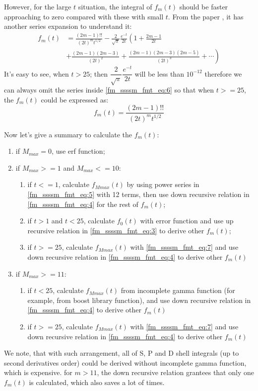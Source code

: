 However, for the large $t$ situation, the integral of $f_{m}(t)$ should be faster
approaching to zero compared with these with small $t$. From the paper 
\cite{harris1983sssm}, it has another series expansion to understand it:
\begin{equation}
\begin{split}
 f_{m}(t) &= \frac{(2m-1)!!}{(2t)^{m}t^{1/2}}-\frac{2}{\sqrt{\pi}}\frac{e^{-t}}{2t} 
 \left( 1+\frac{2m-1}{2t} \right. \\
 &+ \left. \frac{(2m-1)(2m-3)}{(2t)^{2}} + \frac{(2m-1)(2m-3)(2m-5)}{(2t)^{3}}+ \cdots 
 \right) 
\end{split}
 \label{fm_ssssm_fmt_eq:6}
\end{equation}
It's easy to see, when $t>25$; then $\dfrac{2}{\sqrt{\pi}}\dfrac{e^{-t}}{2t}$
will be less than $10^{-12}$ therefore we can always omit the series inside 
\ref{fm_ssssm_fmt_eq:6} so that when $t>=25$, the $f_{m}(t)$ could be expressed 
as:
\begin{equation}
 \label{fm_ssssm_fmt_eq:7}
 f_{m}(t) = \frac{(2m-1)!!}{(2t)^{m}t^{1/2}}
\end{equation}

Now let's give a summary to calculate the $f_{m}(t)$:
\begin{enumerate}
 \item if $M_{max} = 0$, use erf function;
 \item if $M_{max} >= 1$ and $M_{max} <= 10$:
 \begin{enumerate}
  \item if $t<=1$, calculate $f_{Mmax}(t)$ by using power series in 
  \ref{fm_ssssm_fmt_eq:5} with 12 terms, then use down recursive relation
  in \ref{fm_ssssm_fmt_eq:4} for the rest of $f_{m}(t)$;
  \item if $t>1$ and $t<25$, calculate $f_{0}(t)$ with error function and 
  use up recursive relation in \ref{fm_ssssm_fmt_eq:3} to derive other $f_{m}(t)$;
  \item if $t>=25$, calculate $f_{Mmax}(t)$ with \ref{fm_ssssm_fmt_eq:7} and use down 
  recursive relation in \ref{fm_ssssm_fmt_eq:4} to derive other $f_{m}(t)$
 \end{enumerate}
 \item if $M_{max} >= 11$:
 \begin{enumerate}
  \item if $t<25$, calculate $f_{Mmax}(t)$ from incomplete gamma function (for example,
  from boost library function), and use down 
  recursive relation in \ref{fm_ssssm_fmt_eq:4} to derive other $f_{m}(t)$
  \item if $t>=25$, calculate $f_{Mmax}(t)$ with \ref{fm_ssssm_fmt_eq:7} and use down 
  recursive relation in \ref{fm_ssssm_fmt_eq:4} to derive other $f_{m}(t)$
 \end{enumerate}
\end{enumerate}
We note, that with such arrangement, all of S, P and D shell integrals (up to second 
derivatives order) could be derived without incomplete gamma function, which is 
expensive. for $m>11$, the down recursive relation grantees that only one $f_{m}(t)$
is calculated, which also saves a lot of times.

